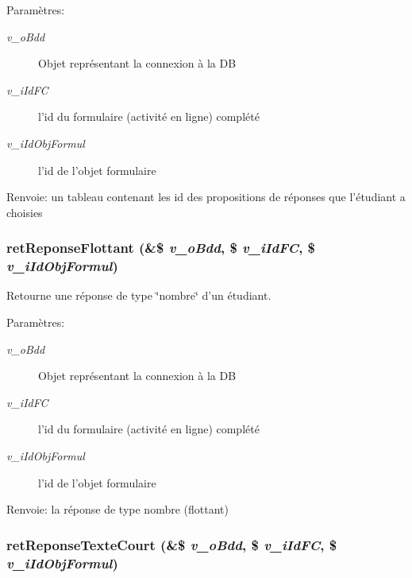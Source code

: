 \begin{Desc}
\item[Paramètres:]
\begin{description}
\item[{\em v\_\-oBdd}]Objet représentant la connexion à la DB \item[{\em v\_\-iIdFC}]l'id du formulaire (activité en ligne) complété \item[{\em v\_\-iIdObjFormul}]l'id de l'objet formulaire\end{description}
\end{Desc}
\begin{Desc}
\item[Renvoie:]un tableau contenant les id des propositions de réponses que l'étudiant a choisies \end{Desc}
\subsubsection{\setlength{\rightskip}{0pt plus 5cm}retReponseFlottant (\&\$ {\em v\_\-oBdd}, \/  \$ {\em v\_\-iIdFC}, \/  \$ {\em v\_\-iIdObjFormul})}\label{fonctions__form_8inc_8php_06ca52c1a9709fc72a5c7ef24e438fe8}


Retourne une réponse de type \char`\"{}nombre\char`\"{} d'un étudiant. 

\begin{Desc}
\item[Paramètres:]
\begin{description}
\item[{\em v\_\-oBdd}]Objet représentant la connexion à la DB \item[{\em v\_\-iIdFC}]l'id du formulaire (activité en ligne) complété \item[{\em v\_\-iIdObjFormul}]l'id de l'objet formulaire\end{description}
\end{Desc}
\begin{Desc}
\item[Renvoie:]la réponse de type nombre (flottant) \end{Desc}
\subsubsection{\setlength{\rightskip}{0pt plus 5cm}retReponseTexteCourt (\&\$ {\em v\_\-oBdd}, \/  \$ {\em v\_\-iIdFC}, \/  \$ {\em v\_\-iIdObjFormul})}\label{fonctions__form_8inc_8php_33815c21bf5a724d9759518441661a15}


